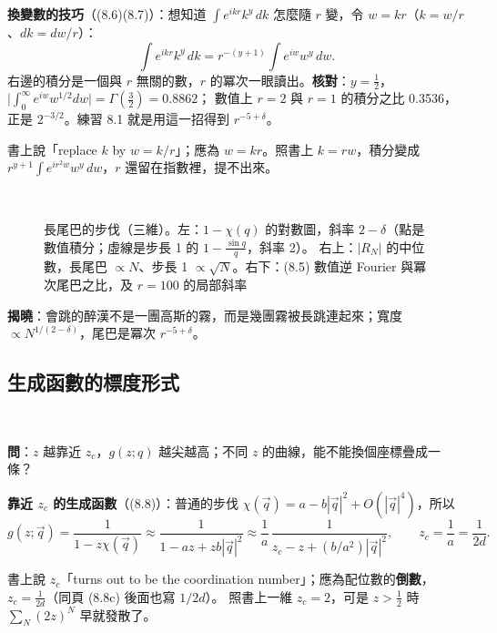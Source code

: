 \textbf{換變數的技巧}（(8.6)(8.7)）：想知道 $\int e^{ikr}k^y\,dk$ 怎麼隨 $r$ 變，令 $w=kr$（$k=w/r$、$dk=dw/r$）：
\[\int e^{ikr}k^y\,dk=r^{-(y+1)}\int e^{iw}w^y\,dw .\tag{8.6, 8.7}\]
右邊的積分是一個與 $r$ 無關的數，$r$ 的冪次一眼讀出。\textbf{核對}：$y=\frac12$，$\big|\int_0^\infty e^{iw}w^{1/2}dw\big|=\Gamma(\frac32)=0.8862$；
數值上 $r=2$ 與 $r=1$ 的積分之比 0.3536，正是 $2^{-3/2}$。練習 8.1 就是用這一招得到 $r^{-5+\delta}$。
\begin{errbox}[p.~195，(8.6)$\to$(8.7)]
書上說「replace $k$ by $w=k/r$」；應為 $w=kr$。照書上 $k=rw$，積分變成 $r^{y+1}\int e^{ir^2w}w^y\,dw$，$r$ 還留在指數裡，提不出來。
\end{errbox}

\begin{figure}[htbp]
\centering
\begin{minipage}[c]{0.46\linewidth}\centering\EightFigChi\end{minipage}\hfill
\begin{minipage}[c]{0.52\linewidth}\centering\footnotesize\setlength{\tabcolsep}{4pt}\EightTabWidth\\[6pt]\EightTabTail\end{minipage}
\caption{長尾巴的步伐（三維）。左：$1-\chi(q)$ 的對數圖，斜率 $2-\delta$（點是數值積分；虛線是步長 1 的 $1-\frac{\sin q}q$，斜率 2）。
右上：$|R_N|$ 的中位數，長尾巴 $\propto N$、步長 1 $\propto\sqrt N$。右下：(8.5) 數值逆 Fourier 與冪次尾巴之比，及 $r=100$ 的局部斜率}\label{eight-fig-levy}
\end{figure}

\textbf{揭曉}：會跳的醉漢不是一團高斯的霧，而是幾團霧被長跳連起來；寬度 $\propto N^{1/(2-\delta)}$，尾巴是冪次 $r^{-5+\delta}$。

\subsection{生成函數的標度形式}
\leavevmode{}\ \par\nopagebreak

\textbf{問}：$z$ 越靠近 $z_c$，$g(z;q)$ 越尖越高；不同 $z$ 的曲線，能不能換個座標疊成一條？

\textbf{靠近 $z_c$ 的生成函數}（(8.8)）：普通的步伐 $\chi(\vec q)=a-b|\vec q|^2+O(|\vec q|^4)$，所以
\[g(z;\vec q)=\frac1{1-z\chi(\vec q)}\approx\frac1{1-az+zb|\vec q|^2}\approx\frac1a\,\frac1{z_c-z+(b/a^2)|\vec q|^2},\qquad z_c=\frac1a=\frac1{2d}.\tag{8.8}\]
\begin{errbox}[p.~196，第一段]
書上說 $z_c$「turns out to be the coordination number」；應為配位數的\textbf{倒數}，$z_c=\frac1{2d}$（同頁 (8.8c) 後面也寫 $1/2d$）。
照書上一維 $z_c=2$，可是 $z>\frac12$ 時 $\sum_N(2z)^N$ 早就發散了。
\end{errbox}

